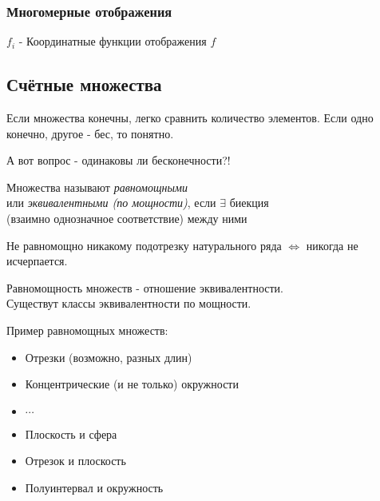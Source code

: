 \documentclass[12pt, a4paper]{article}
\begin{document}
  \subsubsection{Многомерные отображения}

  $f_i$ - Координатные функции отображения $f$


  \subsection{Счётные множества}

  Если множества конечны, легко сравнить количество элементов.
  Если одно конечно, другое - бес, то понятно.

  А вот вопрос - одинаковы ли бесконечности?!



  \begin{definition}
  Множества называют \textit{равномощными} \\
  или \textit{эквивалентными (по мощности)}, если $\exists$ биекция \\
  (взаимно однозначное соответствие) между ними
  \end{definition}

  \begin{definition}
  Не равномощно никакому подотрезку натурального ряда 
  $\Longleftrightarrow$ никогда не исчерпается.
  \end{definition}

  \begin{note}
  Равномощность множеств - отношение эквивалентности. \\
  Существут классы эквивалентности по мощности.
  \end{note}

  \begin{example}
  Пример равномощных множеств:
  \begin{itemize}
    \item Отрезки (возможно, разных длин)
    \item Концентрические (и не только) окружности
    \item $\cdots$
    \item Плоскость и сфера
    \item Отрезок и плоскость
    \item Полуинтервал и окружность
  \end{itemize}
  \end{example}
\end{document}
